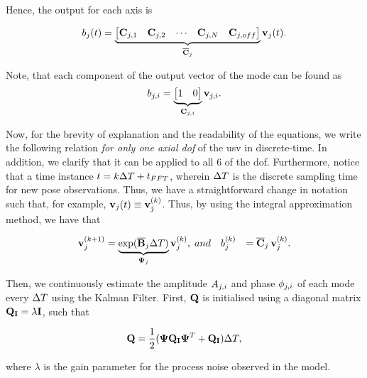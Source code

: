 \documentclass[letterpaper, 10 pt, journal, twoside]{IEEEtran}
\begin{document}
Hence, the output for each axis is
\begin{small}
\begin{equation}
\begin{aligned}
    b_j(t) = \underbrace{\begin{bmatrix}
    \mathbf{C}_{j,1} & \mathbf{C}_{j,2} & \cdots & \mathbf{C}_{j,N} & \mathbf{C}_{j,off}\\
    \end{bmatrix}}_{\overline{\mathbf{C}}_j}\mathbf{v}_j(t).
    \end{aligned}
\end{equation}
\end{small}

Note, that each component of the output vector of the mode can be found as
\begin{equation}
    b_{j,i} = \underbrace{\begin{bmatrix}
    1 & 0\\
    \end{bmatrix}}_{\mathbf{C}_{j,i}} \mathbf{v}_{j,i}.
\end{equation}

Now, for the brevity of explanation and the readability of the equations, we write the following relation \textit{for only one axial \ac{dof}} of the \ac{usv} in discrete-time. In addition, we clarify that it can be applied to all 6 of the \ac{dof}. Furthermore, notice that a time instance $t = k \Delta T + t_{FFT}$, wherein $\Delta T$ is the discrete sampling time for new pose observations. Thus, we have a straightforward change in notation such that, for example, $\mathbf{v}_j(t) \equiv \mathbf{v}_{j}^{(k)}$. Thus, by using the integral approximation method, we have that
\begin{small}
\begin{equation}
\begin{aligned}
\mathbf{v}_j^{(k+1)} &= \underbrace{\exp({\overline{\mathbf{B}}_j \Delta T})}_{\mathbf{\Psi}_j} \mathbf{v}_j^{(k)},\; and \quad
b_j^{(k)} &= \overline{\mathbf{C}}_j \hspace{2pt}\mathbf{v}_j^{(k)}.
\end{aligned}
\end{equation}
\end{small}

Then, we continuously estimate the amplitude $A_{j,i}$ and phase $\phi_{j,i}$ of each mode every $\Delta T$ using the Kalman Filter. First, $\mathbf{Q}$ is initialised using a diagonal matrix $\mathbf{Q_I} = \lambda\mathbf{I}$, such that
\begin{small}
\begin{equation}
    \mathbf{Q} = \frac{1}{2} (\mathbf{\Psi}  \mathbf{Q_I}  \mathbf{\Psi}^T + \mathbf{Q_I})  \Delta T,
\end{equation}
\end{small}\noindent
where $\lambda$ is the gain parameter for the process noise observed in the model.
\end{document}
